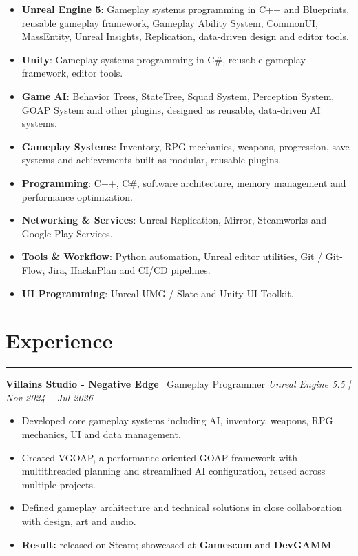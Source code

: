 \documentclass[8.5pt]{article}
\newcommand{\sectionline}{
    \vspace{-2pt}
    \hrule
    \vspace{1pt}
}
\newcommand{\cvsection}[1]{
    \section*{#1}
    \sectionline
}
\begin{document}
    \begin{itemize}

        \item
        \textbf{Unreal Engine 5}: Gameplay systems programming in C++ and Blueprints, reusable gameplay framework,
        Gameplay Ability System, CommonUI, MassEntity, Unreal Insights, Replication, data-driven design and editor tools.

        \item
        \textbf{Unity}: Gameplay systems programming in C\#, reusable gameplay framework, editor tools.

        \item
        \textbf{Game AI}: Behavior Trees, StateTree, Squad System, Perception System, GOAP System and other plugins,
        designed as reusable, data-driven AI systems.

        \item
        \textbf{Gameplay Systems}: Inventory, RPG mechanics, weapons, progression, save systems and
        achievements built as modular, reusable plugins.

        \item
        \textbf{Programming}: C++, C\#, software architecture,
        memory management and performance optimization.

        \item
        \textbf{Networking \& Services}: Unreal Replication, Mirror, Steamworks and Google Play Services.

        \item
        \textbf{Tools \& Workflow}: Python automation, Unreal editor utilities, Git / Git-Flow, Jira,
        HacknPlan and CI/CD pipelines.

        \item
        \textbf{UI Programming}: Unreal UMG / Slate and Unity UI Toolkit.

    \end{itemize}



    \cvsection{Experience}

    \textbf{Villains Studio - Negative Edge} \textemdash\ Gameplay Programmer
    \hfill
    \textit{Unreal Engine 5.5 | Nov 2024 -- Jul 2026}

    \begin{itemize}
        \item Developed core gameplay systems including AI, inventory, weapons, RPG mechanics, UI and data management.
        \item Created VGOAP, a performance-oriented GOAP framework with multithreaded planning and streamlined AI configuration, reused across multiple projects.
        \item Defined gameplay architecture and technical solutions in close collaboration with design, art and audio.
        \item \textbf{Result:} released on Steam; showcased at \textbf{Gamescom} and \textbf{DevGAMM}.
    \end{itemize}
\end{document}
